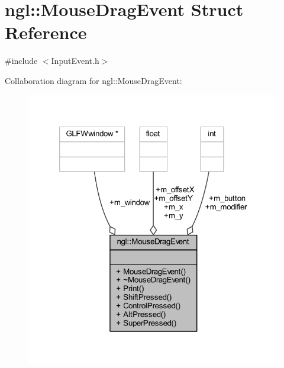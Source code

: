 \hypertarget{structngl_1_1_mouse_drag_event}{}\section{ngl\+:\+:Mouse\+Drag\+Event Struct Reference}
\label{structngl_1_1_mouse_drag_event}


{\ttfamily \#include $<$Input\+Event.\+h$>$}



Collaboration diagram for ngl\+:\+:Mouse\+Drag\+Event\+:
\nopagebreak
\begin{figure}[H]
\begin{center}
\leavevmode
\includegraphics[width=320pt]{structngl_1_1_mouse_drag_event__coll__graph}
\end{center}
\end{figure}
